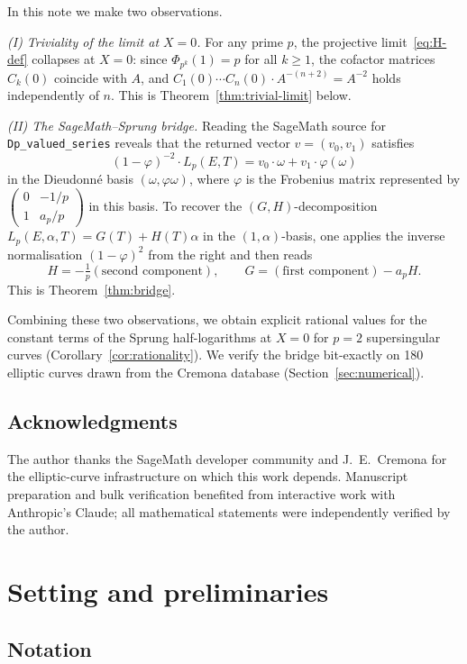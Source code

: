 \documentclass[11pt,a4paper]{amsart}
\theoremstyle{definition}
\begin{document}
In this note we make two observations.

\emph{(I) Triviality of the limit at $X=0$.} For any prime $p$, the projective limit~\eqref{eq:H-def} collapses at $X = 0$: since $\Phi_{p^k}(1) = p$ for all $k \geq 1$, the cofactor matrices $C_k(0)$ coincide with $A$, and $C_1(0) \cdots C_n(0) \cdot A^{-(n+2)} = A^{-2}$ holds independently of $n$. This is Theorem~\ref{thm:trivial-limit} below.

\emph{(II) The SageMath--Sprung bridge.} Reading the SageMath source for \texttt{Dp\_valued\_series} reveals that the returned vector $v = (v_0, v_1)$ satisfies
\[
(1 - \varphi)^{-2} \cdot L_p(E, T) = v_0 \cdot \omega + v_1 \cdot \varphi(\omega)
\]
in the Dieudonn\'e basis $(\omega, \varphi\omega)$, where $\varphi$ is the Frobenius matrix represented by $\begin{pmatrix} 0 & -1/p \\ 1 & a_p/p \end{pmatrix}$ in this basis. To recover the $(G, H)$-decomposition $L_p(E, \alpha, T) = G(T) + H(T)\alpha$ in the $(1, \alpha)$-basis, one applies the inverse normalisation $(1-\varphi)^2$ from the right and then reads
\[
H = -\tfrac{1}{p} (\text{second component}), \qquad G = (\text{first component}) - a_p H.
\]
This is Theorem~\ref{thm:bridge}.

Combining these two observations, we obtain explicit rational values for the constant terms of the Sprung half-logarithms at $X = 0$ for $p = 2$ supersingular curves (Corollary~\ref{cor:rationality}). We verify the bridge bit-exactly on 180 elliptic curves drawn from the Cremona database (Section~\ref{sec:numerical}).

\subsection*{Acknowledgments}

The author thanks the SageMath developer community and J.~E.~Cremona for the elliptic-curve infrastructure on which this work depends. Manuscript preparation and bulk verification benefited from interactive work with Anthropic's Claude; all mathematical statements were independently verified by the author.

\section{Setting and preliminaries}\label{sec:setting}

\subsection{Notation}
\end{document}
